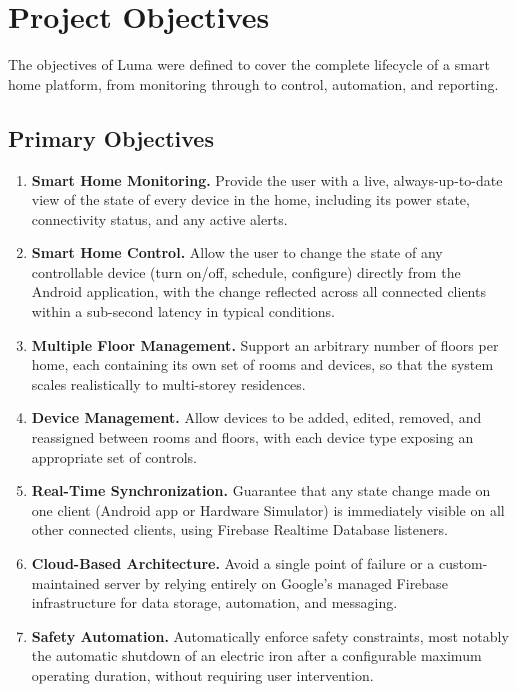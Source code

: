 \documentclass[11pt,a4paper]{article}
\begin{document}
\section{Project Objectives}
\label{sec:objectives}

The objectives of Luma were defined to cover the complete lifecycle of a smart home platform, from monitoring through to control, automation, and reporting.

\subsection{Primary Objectives}
\begin{enumerate}[label=O\arabic*.]
    \item \textbf{Smart Home Monitoring.} Provide the user with a live, always-up-to-date view of the state of every device in the home, including its power state, connectivity status, and any active alerts.
    \item \textbf{Smart Home Control.} Allow the user to change the state of any controllable device (turn on/off, schedule, configure) directly from the Android application, with the change reflected across all connected clients within a sub-second latency in typical conditions.
    \item \textbf{Multiple Floor Management.} Support an arbitrary number of floors per home, each containing its own set of rooms and devices, so that the system scales realistically to multi-storey residences.
    \item \textbf{Device Management.} Allow devices to be added, edited, removed, and reassigned between rooms and floors, with each device type exposing an appropriate set of controls.
    \item \textbf{Real-Time Synchronization.} Guarantee that any state change made on one client (Android app or Hardware Simulator) is immediately visible on all other connected clients, using Firebase Realtime Database listeners.
    \item \textbf{Cloud-Based Architecture.} Avoid a single point of failure or a custom-maintained server by relying entirely on Google's managed Firebase infrastructure for data storage, automation, and messaging.
    \item \textbf{Safety Automation.} Automatically enforce safety constraints, most notably the automatic shutdown of an electric iron after a configurable maximum operating duration, without requiring user intervention.

\end{enumerate}
\end{document}

